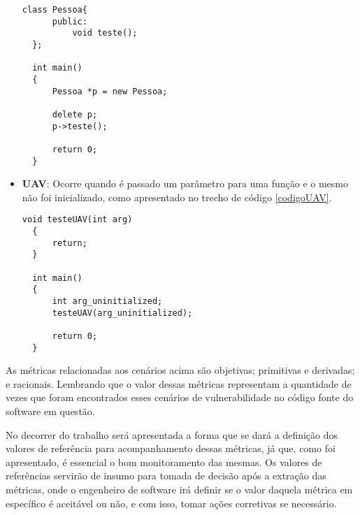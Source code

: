 \begin{itemize}
    \begin{lstlisting}[caption={Código exemplo UAF}, label=codigoUAF]
  class Pessoa{
      public:
          void teste();
  };

  int main()
  {
      Pessoa *p = new Pessoa;

      delete p;
      p->teste();

      return 0;
  }
    \end{lstlisting}
  \item \textbf{UAV}: Ocorre quando é passado um parâmetro para uma função e o mesmo não foi inicializado, como apresentado no 
    trecho de código \ref{codigoUAV}.

    \begin{lstlisting}[caption={Código exemplo UAV}, label=codigoUAV]
  void testeUAV(int arg)
  {
      return;
  }

  int main()
  {
      int arg_uninitialized;
      testeUAV(arg_uninitialized);
      
      return 0;
  }
    \end{lstlisting}
\end{itemize}

As métricas relacionadas aos cenários acima são objetivas; primitivas e derivadas; e racionais. Lembrando que o valor dessas 
métricas representam a quantidade de vezes que foram encontrados esses cenários de vulnerabilidade no código fonte do software 
em questão.

No decorrer do trabalho será apresentada a forma que se dará a definição dos valores de referência para acompanhamento dessas
métricas, já que, como foi apresentado, é essencial o bom monitoramento das mesmas. Os valores de referências servirão
de insumo para tomada de decisão após a extração das métricas, onde o engenheiro de software irá definir se o valor daquela
métrica em específico é aceitável ou não, e com isso, tomar ações corretivas se necessário.

